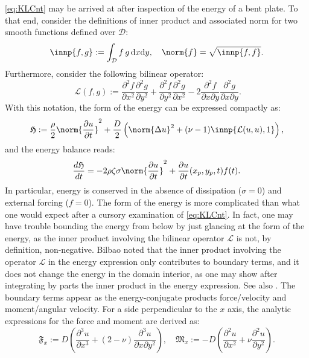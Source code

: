 \eqref{eq:KLCnt} may be arrived at after inspection of the energy of a bent plate. To that end, consider the definitions of inner product and associated norm for two smooth functions defined over $\mathcal{D}$:
\begin{equation}
\innp{f,g} := \int_{\mathcal D} f\,g\,\mathrm{d}x\mathrm{d}y, \quad \norm{f} = \sqrt{\innp{f,f}}.
\end{equation}
Furthermore, consider the following bilinear operator:
\begin{equation}\
\mathcal{L}(f,g) := \frac{\partial^2 f}{\partial x^2}\frac{\partial^2 g}{\partial y^2} + \frac{\partial^2 f}{\partial y^2}\frac{\partial^2 g}{\partial x^2} - 2\frac{\partial^2 f}{\partial x\partial y}\frac{\partial^2 g}{\partial x\partial y}.
\end{equation}
With this notation, the form of the energy can be expressed compactly as:
\begin{equation}\label{eq:CntEn}
\mathfrak{H} := \frac{\rho}{2}\norm{\frac{\partial u}{\partial t}}^2 + \frac{D}{2}\left(\norm{\Delta u}^2 + (\nu-1)\innp{\mathcal{L}(u,u),1}\right),
\end{equation}
and the energy balance reads:
\begin{equation}\label{eq:EnBalCnt}
\frac{d \mathfrak{H}}{dt} = -2\rho\zeta\sigma\norm{ \frac{\partial u}{\partial t}}^2 + \frac{\partial u}{\partial t}(x_p,y_p,t)f(t).
\end{equation}
In particular, energy is conserved in the absence of dissipation ($\sigma = 0$) and external forcing ($f=0$).
The form of the energy is more complicated than what one would expect after a cursory examination of \eqref{eq:KLCnt}. In fact, one may have trouble bounding the energy from below by just glancing at the form of the energy, as the inner product involving the bilinear operator $\mathcal L$ is not, by definition, non-negative. Bilbao \cite[Chapter 11]{bilbao_numerical_2009} noted that the inner product involving the operator $\mathcal L$ in the energy expression only contributes to boundary terms, and it does not change the energy in the domain interior, as one may show after integrating by parts the inner product in the energy expression. See also \cite{thomas2008geometrically}. The boundary terms appear as the energy-conjugate products force/velocity and moment/angular velocity. For a side perpendicular to the $x$ axis, the analytic expressions for the force and moment are derived as:
\begin{equation}
\mathfrak{F}_x := D \left(\frac{\partial^3 u}{\partial x^3} + (2-\nu)\frac{\partial^3 u}{\partial x \partial y^2}\right), \quad \mathfrak{M}_x := -D\left(\frac{\partial^2 u}{\partial x^2} + \nu \frac{\partial^2 u}{\partial y^2} \right).
\end{equation}
